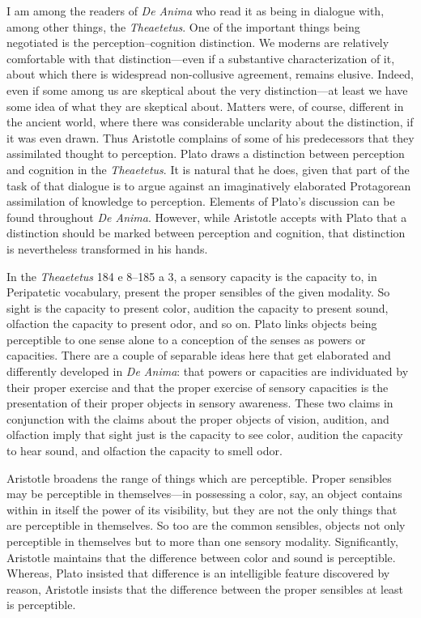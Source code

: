 \documentclass[12pt]{article}
\begin{document}
I am among the readers of \emph{De Anima} who read it as being in dialogue with, among other things, the \emph{Theaetetus}. One of the important things being negotiated is the perception--cognition distinction. We moderns are relatively comfortable with that distinction---even if a substantive characterization of it, about which there is widespread non-collusive agreement, remains elusive. Indeed, even if some among us are skeptical about the very distinction---at least we have some idea of what they are skeptical about. Matters were, of course, different in the ancient world, where there was considerable unclarity about the distinction, if it was even drawn. Thus Aristotle complains of some of his predecessors that they assimilated thought to perception. Plato draws a distinction between perception and cognition in the \emph{Theaetetus}. It is natural that he does, given that part of the task of that dialogue is to argue against an imaginatively elaborated Protagorean assimilation of knowledge to perception. Elements of Plato's discussion can be found throughout \emph{De Anima}. However, while Aristotle accepts with Plato that a distinction should be marked between perception and cognition, that distinction is nevertheless transformed in his hands.

In the \emph{Theaetetus} 184 e 8--185 a 3, a sensory capacity is the capacity to, in Peripatetic vocabulary, present the proper sensibles of the given modality. So sight is the capacity to present color, audition the capacity to present sound, olfaction the capacity to present odor, and so on. Plato links objects being perceptible to one sense alone to a conception of the senses as powers or capacities. There are a couple of separable ideas here that get elaborated and differently developed in \emph{De Anima}: that powers or capacities are individuated by their proper exercise and that the proper exercise of sensory capacities is the presentation of their proper objects in sensory awareness. These two claims in conjunction with the claims about the proper objects of vision, audition, and olfaction imply that sight just is the capacity to see color, audition the capacity to hear sound, and olfaction the capacity to smell odor. 

Aristotle broadens the range of things which are perceptible. Proper sensibles may be perceptible in themselves---in possessing a color, say, an object contains within in itself the power of its visibility, but they are not the only things that are perceptible in themselves. So too are the common sensibles, objects not only perceptible in themselves but to more than one sensory modality. Significantly, Aristotle maintains that the difference between color and sound is perceptible. Whereas, Plato insisted that difference is an intelligible feature discovered by reason, Aristotle insists that the difference between the proper sensibles at least is perceptible.
\end{document}
